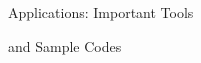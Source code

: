 \begin{frame}
\Huge{\centerline{Applications: Important Tools}}
\Huge{\centerline{and Sample Codes}}
\end{frame}